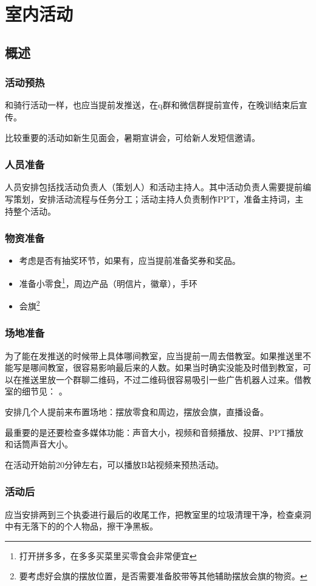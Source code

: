 \documentclass{ctexbook}
\begin{document}
\section{室内活动}
\subsection{概述}
\label{sec:室内活动}
\subsubsection{活动预热}
和骑行活动一样，也应当提前发推送，在q群和微信群提前宣传，在晚训结束后宣传。

比较重要的活动如新生见面会，暑期宣讲会，可给新人发短信邀请。

\subsubsection{人员准备}
人员安排包括找活动负责人（策划人）和活动主持人。其中活动负责人需要提前编写策划，安排活动流程与任务分工；活动主持人负责制作PPT，准备主持词，主持整个活动。
\subsubsection{物资准备}
\begin{itemize}
    \item 考虑是否有抽奖环节，如果有，应当提前准备奖券和奖品。
    \item 准备小零食\footnote{打开拼多多，在多多买菜里买零食会非常便宜}，周边产品（明信片，徽章），手环
    \item 会旗\footnote{要考虑好会旗的摆放位置，是否需要准备胶带等其他辅助摆放会旗的物资。}
\end{itemize}
\subsubsection{场地准备}
为了能在发推送的时候带上具体哪间教室，应当提前一周去借教室。如果推送里不能写是哪间教室，很容易影响最后来的人数。如果当时确实没能及时借到教室，可以在推送里放一个群聊二维码，不过二维码很容易吸引一些广告机器人过来。借教室的细节见： \pageref{sec:借教室}。


安排几个人提前来布置场地：摆放零食和周边，摆放会旗，直播设备。

最重要的是还要检查多媒体功能：声音大小，视频和音频播放、投屏、PPT播放和话筒声音大小。

在活动开始前20分钟左右，可以播放B站视频来预热活动。

\subsubsection{活动后}
应当安排两到三个执委进行最后的收尾工作，把教室里的垃圾清理干净，检查桌洞中有无落下的的个人物品，擦干净黑板。
\end{document}
